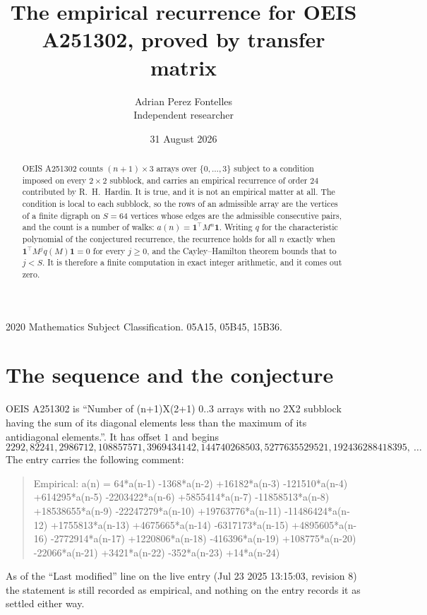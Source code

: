 \documentclass[11pt,a4paper]{article}
\title{The empirical recurrence for OEIS A251302, proved by transfer matrix}
\author{Adrian Perez Fontelles\\ \small Independent researcher}
\date{31 August 2026}
\theoremstyle{plain}
\theoremstyle{definition}
\begin{document}
\maketitle

\begin{abstract}
OEIS A251302 counts $(n+1)\times3$ arrays over $\{0,\dots,3\}$ subject to a condition imposed on
every $2\times2$ subblock, and carries an empirical recurrence of order $24$ contributed
by R.~H.~Hardin. It is true, and it is not an empirical matter at all. The condition is local
to each subblock, so the rows of an admissible array are the vertices of a finite digraph
on $S=64$ vertices whose edges are the admissible consecutive pairs, and the count is a
number of walks: $a(n)=\mathbf{1}^{\!\top}M^{n}\mathbf{1}$. Writing $q$
for the characteristic polynomial of the conjectured recurrence, the recurrence holds for all
$n$ exactly when $\mathbf{1}^{\!\top}M^{j}q(M)\mathbf{1}=0$ for every $j\ge0$, and the
Cayley--Hamilton theorem bounds that to $j<S$. It is therefore a finite computation in exact
integer arithmetic, and it comes out zero.
\end{abstract}

\noindent\small 2020 Mathematics Subject Classification. 05A15, 05B45, 15B36.\normalsize

\section{The sequence and the conjecture}

OEIS A251302 is ``Number of (n+1)X(2+1) 0..3 arrays with no 2X2 subblock having the sum of its diagonal elements less than the maximum of its antidiagonal elements.''. It has offset $1$ and begins
\[
2292, 82241, 2986712, 108857571, 3969434142, 144740268503, 5277635529521, 192436288418395,\ \dots
\]
The entry carries the following comment:
\begin{quote}\small
Empirical: a(n) = 64*a(n-1) -1368*a(n-2) +16182*a(n-3) -121510*a(n-4) +614295*a(n-5) -2203422*a(n-6) +5855414*a(n-7) -11858513*a(n-8) +18538655*a(n-9) -22247279*a(n-10) +19763776*a(n-11) -11486424*a(n-12) +1755813*a(n-13) +4675665*a(n-14) -6317173*a(n-15) +4895605*a(n-16) -2772914*a(n-17) +1220806*a(n-18) -416396*a(n-19) +108775*a(n-20) -22066*a(n-21) +3421*a(n-22) -352*a(n-23) +14*a(n-24)
\end{quote}
As of the ``Last modified'' line on the live entry (Jul 23 2025 13:15:03, revision 8) the statement is
still recorded as empirical, and nothing on the entry records it as settled either way.
\end{document}
